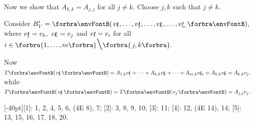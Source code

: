 Now we show that $A_{k,k}=A_{j,j}$ for all $j\neq k.$ Choose $j,k$ such that $j\neq k.$\vspace{1pt}\par\quad
Consider $B_V'=\Par{v\apostrophe{\hspace{-3pt}_1},\dots,v\apostrophe{\hspace{-3pt}_j},\dots,v\apostrophe{\hspace{-3pt}_k},\dots,v\apostrophe_{\hspace{-3pt}_m}},$ where $v\prime{\hspace{-3pt}_j}=v_k,\,\,v\prime{\hspace{-3pt}_k}=v_j$ and $v\prime{\hspace{-3pt}_i}=v_i$ for all $i\in\Bra{1,\dots,m}\Backslash[\LARGE]\Bra{\,j,k}.$\vspace{1pt}\par\quad
Now $T\Par{v\apostrophe{\hspace{-3pt}_k}}=A_{1,k}v\apostrophe{\hspace{-3pt}_1}+\dots+A_{k,k}v\apostrophe{\hspace{-3pt}_k}+\dots+A_{m,k}v\apostrophe{\hspace{-3pt}_m}=A_{k,k}v\apostrophe{\hspace{-3pt}_k}=A_{k,k}v_j,$ while $T\Par{v\apostrophe{\hspace{-3pt}_k}}=T\Par{v_j}=A_{j,j}v_j.$\PfEnd
\SepLine
\ChEnd\pagebreak

[-40pt]{[1]: 1, 2, 4, 5, 6, (4E 8), 7; [2]: 3, 8, 9, 10; [3]: 11; [4]: 12, (4E 14), 14; [5]: 13, 15, 16, 17, 18, 20.}
\vspace{6pt}

\SepLine

